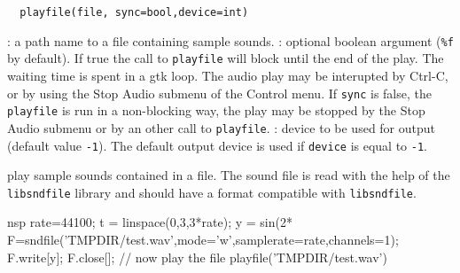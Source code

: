 
\begin{mandesc}
\end{mandesc}
\begin{calling_sequence}
\begin{verbatim}
  playfile(file, sync=bool,device=int)
\end{verbatim}
\end{calling_sequence}
\begin{parameters}
  \begin{varlist}
    : a path name to a file containing sample sounds. 
    : optional boolean argument (\verb+%f+ by default). 
    If true the call to \verb+playfile+ 
    will block until the end of the play. The waiting time is spent
    in a gtk loop. The audio play may be interupted by 
    Ctrl-C, or by using the Stop Audio submenu of the Control menu. 
    If \verb+sync+ is false, the \verb+playfile+ is run in a non-blocking way, the 
    play may be stopped by the  Stop Audio submenu or by an other call 
    to \verb+playfile+. 
   : device to be used for output (default value \verb+-1+). The default output 
   device is used if \verb+device+ is equal to \verb+-1+.
  \end{varlist}
\end{parameters}

\begin{mandescription}
  play sample sounds contained in a file. The sound file is read with 
  the help of the \verb+libsndfile+ library and should have a format compatible with 
  \verb+libsndfile+.
\end{mandescription}
\begin{examples}
  \begin{mintednsp}{nsp}
    rate=44100;
    t = linspace(0,3,3*rate);
    y = sin(2*%
    F=sndfile('TMPDIR/test.wav',mode='w',samplerate=rate,channels=1);
    F.write[y];
    F.close[];
    // now play the file 
    playfile('TMPDIR/test.wav')
  \end{mintednsp}
\end{examples}
\begin{manseealso}
\end{manseealso}

